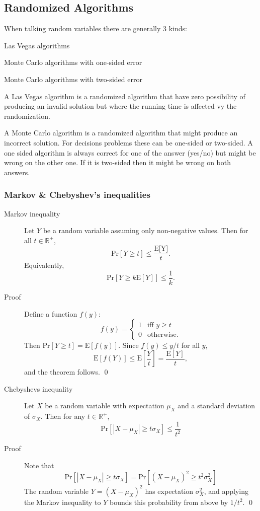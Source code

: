 \subsection{Randomized Algorithms}

When talking random variables there are generally 3 kinds:
\begin{enumerate*}
  \item Las Vegas algorithms
  \item Monte Carlo algorithms with one-sided error
  \item Monte Carlo algorithms with two-sided error
\end{enumerate*}

A Las Vegas algorithm is a randomized algorithm that have zero possibility of
producing an invalid solution but where the running time is affected vy the
randomization.

A Monte Carlo algorithm is a randomized algorithm that might produce an
incorrect solution. For decisions problems these can be one-sided or
two-sided. A one sided algorithm is always correct for one of the answer
(yes/no) but might be wrong on the other one. If it is two-sided then it might
be wrong on both answers.


\subsubsection{Markov \& Chebyshev's inequalities}
\begin{description}
\item[Markov inequality] Let $Y$ be a random variable assuming only non-negative
  values. Then for all $t \in \mathbb{R}^+$,
  \[
    \text{Pr}[Y \geq t] \leq \frac{\text{E[Y]}}{t}.
  \]
  Equivalently,
  \[
    \text{Pr}[Y \geq k\text{E}[Y]] \leq \frac{1}{k}.
  \]
\item[Proof] Define a function $f(y)$:
  \[
   f(y) = \begin{cases}
     1 & \text{iff } y \geq t\\
     0 & \text{otherwise.}
   \end{cases}
  \]
  Then $\text{Pr}[Y \geq t] = \text{E}[f(y)]$. Since $f(y) \leq y/t$ for all $y$,
  \[
    \text{E}[f(Y)] \leq \text{E}\left [\frac{Y}{t} \right ] = \frac{\text{E}[Y]}{t},
  \]
  and the theorem follows. \qed
\end{description}

\begin{description}
\item[Chebyshevs inequality] Let $X$ be a random variable with expectation
  $\mu_X$ and a standard deviation of $\sigma_X$. Then for any $t \in
  \mathbb{R}^+$,
  \[
    \text{Pr}[|X - \mu_X| \geq t\sigma_X] \leq \frac{1}{t^2}
  \]
\item[Proof] Note that
  \[
    \text{Pr}[|X - \mu_X| \geq t\sigma_X] = \text{Pr}[(X - \mu_X)^2 \geq
    t^2\sigma_X^2]
  \]
  The random variable $Y = (X - \mu_X)^2$ has expectation $\sigma_X^2$, and
  applying the Markov inequality to $Y$ bounds this probability from above by
  $1/t^2$. \qed
\end{description}

